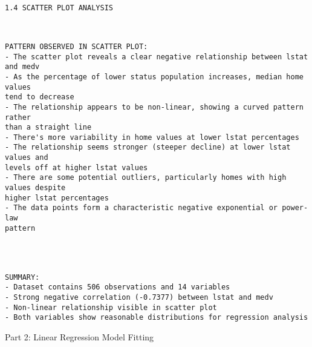 \documentclass[11pt, twocolumn]{article}
\begin{document}
    \begin{Verbatim}[commandchars=\\\{\}]

1.4 SCATTER PLOT ANALYSIS
    \end{Verbatim}

    \begin{center}
    \end{center}
    { \hspace*{\fill} \\}
    
    \begin{Verbatim}[commandchars=\\\{\}]
PATTERN OBSERVED IN SCATTER PLOT:
- The scatter plot reveals a clear negative relationship between lstat and medv
- As the percentage of lower status population increases, median home values
tend to decrease
- The relationship appears to be non-linear, showing a curved pattern rather
than a straight line
- There's more variability in home values at lower lstat percentages
- The relationship seems stronger (steeper decline) at lower lstat values and
levels off at higher lstat values
- There are some potential outliers, particularly homes with high values despite
higher lstat percentages
- The data points form a characteristic negative exponential or power-law
pattern
    \end{Verbatim}

    \begin{center}
    \end{center}
    { \hspace*{\fill} \\}
    
    \begin{Verbatim}[commandchars=\\\{\}]

SUMMARY:
- Dataset contains 506 observations and 14 variables
- Strong negative correlation (-0.7377) between lstat and medv
- Non-linear relationship visible in scatter plot
- Both variables show reasonable distributions for regression analysis
    \end{Verbatim}

    Part 2: Linear Regression Model Fitting
\end{document}
